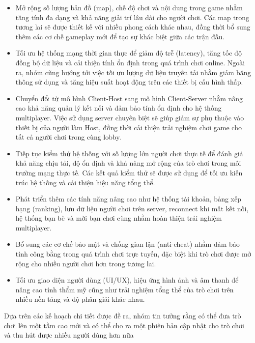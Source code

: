 \begin{itemize}
    \item Mở rộng số lượng bản đồ (map), chế độ chơi và nội dung trong game nhằm tăng tính đa dạng và khả năng giải trí lâu dài cho người chơi. Các map trong tương lai sẽ được thiết kế với nhiều phong cách khác nhau, đồng thời bổ sung thêm các cơ chế gameplay mới để tạo sự khác biệt giữa các trận đấu.

    \item Tối ưu hệ thống mạng thời gian thực để giảm độ trễ (latency), tăng tốc độ đồng bộ dữ liệu và cải thiện tính ổn định trong quá trình chơi online. Ngoài ra, nhóm cũng hướng tới việc tối ưu lượng dữ liệu truyền tải nhằm giảm băng thông sử dụng và tăng hiệu suất hoạt động trên các thiết bị cấu hình thấp.

    \item Chuyển đổi từ mô hình Client-Host sang mô hình Client-Server nhằm nâng cao khả năng quản lý kết nối và đảm bảo tính ổn định cho hệ thống multiplayer. Việc sử dụng server chuyên biệt sẽ giúp giảm sự phụ thuộc vào thiết bị của người làm Host, đồng thời cải thiện trải nghiệm chơi game cho tất cả người chơi trong cùng lobby.

    \item Tiếp tục kiểm thử hệ thống với số lượng lớn người chơi thực tế để đánh giá khả năng chịu tải, độ ổn định và khả năng mở rộng của trò chơi trong môi trường mạng thực tế. Các kết quả kiểm thử sẽ được sử dụng để tối ưu kiến trúc hệ thống và cải thiện hiệu năng tổng thể.

    \item Phát triển thêm các tính năng nâng cao như hệ thống tài khoản, bảng xếp hạng (ranking), lưu dữ liệu người chơi trên server, reconnect khi mất kết nối, hệ thống bạn bè và mời bạn chơi cùng nhằm hoàn thiện trải nghiệm multiplayer.

    \item Bổ sung các cơ chế bảo mật và chống gian lận (anti-cheat) nhằm đảm bảo tính công bằng trong quá trình chơi trực tuyến, đặc biệt khi trò chơi được mở rộng cho nhiều người chơi hơn trong tương lai.

    \item Tối ưu giao diện người dùng (UI/UX), hiệu ứng hình ảnh và âm thanh để nâng cao tính thẩm mỹ cũng như trải nghiệm tổng thể của trò chơi trên nhiều nền tảng và độ phân giải khác nhau.
\end{itemize}
Dựa trên các kế hoạch chi tiết được đề ra, nhóm tin tưởng rằng có thể đưa trò chơi lên một tầm cao mới và có thể cho ra một phiên bản cập nhật cho trò chơi và thu hút được nhiều người dùng hơn nữa